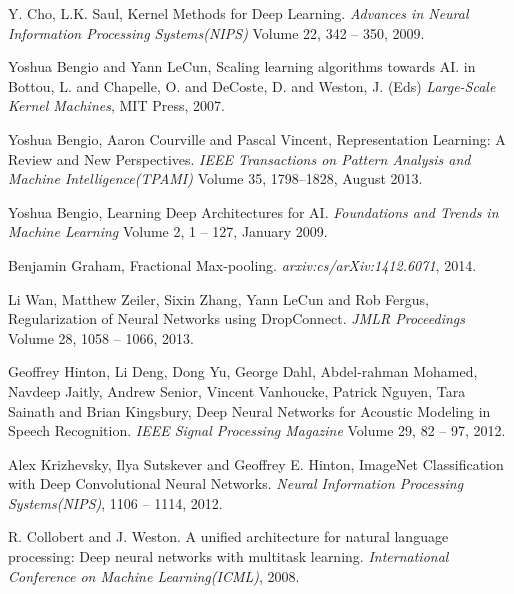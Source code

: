 \documentclass[a4paper, 12pt, oneside]{Thesis}  %
\begin{document}
\begin{thebibliography}{9}
 Y. Cho, L.K. Saul, Kernel Methods  for Deep Learning.
\newblock \emph{Advances in Neural Information Processing Systems(NIPS)} Volume 22, 342 -- 350, 2009.

 Yoshua Bengio and Yann LeCun, Scaling learning algorithms towards AI.  in Bottou, L. and Chapelle, O. and DeCoste, D. and Weston, J. (Eds) \newblock \emph{Large-Scale Kernel Machines}, MIT Press,  2007.

 Yoshua Bengio, Aaron Courville and Pascal Vincent, Representation Learning: A Review and New Perspectives. \newblock \emph{IEEE Transactions on Pattern Analysis and Machine Intelligence(TPAMI)} Volume 35, 1798--1828, August 2013.

 Yoshua Bengio, Learning Deep Architectures for AI. \newblock \emph{Foundations and Trends in Machine Learning} Volume 2, 1 -- 127, January 2009.

Benjamin Graham, Fractional Max-pooling. \newblock \emph{arxiv:cs/arXiv:1412.6071}, 2014.

 Li Wan, Matthew Zeiler, Sixin Zhang, Yann LeCun and  Rob Fergus, Regularization of Neural Networks using DropConnect. \newblock \emph{JMLR Proceedings} Volume 28, 1058 -- 1066, 2013.

 Geoffrey Hinton, Li Deng, Dong Yu, George Dahl, Abdel-rahman Mohamed, Navdeep Jaitly, Andrew Senior, Vincent Vanhoucke, Patrick Nguyen, Tara Sainath and Brian Kingsbury, Deep Neural Networks for Acoustic Modeling in Speech Recognition. \newblock \emph{IEEE Signal Processing Magazine} Volume 29, 82 -- 97, 2012.

 Alex Krizhevsky, Ilya Sutskever and Geoffrey E. Hinton, ImageNet Classification with Deep Convolutional Neural Networks. \newblock \emph{Neural Information Processing Systems(NIPS)}, 1106 -- 1114, 2012.

 R. Collobert and J. Weston. A unified architecture for natural language processing: Deep neural networks with multitask learning. \newblock \emph{International Conference on Machine Learning(ICML)}, 2008.


\end{thebibliography}
\end{document}
